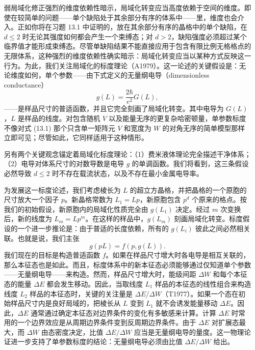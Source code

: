 弱局域化修正强烈的维度依赖性暗示，局域化转变应当高度依赖于空间的维度。即使在较简单的问题——单个缺陷处于其余部分有序的体系中——里，维度也会介入。正如你将在习题 13.1 中证明的，放在其余部分有序的晶格中的单个缺陷，在 $d\leq 2$ 时无论其强度如何都会产生一个束缚态；对 $d>2$，缺陷强度必须超过某个临界值才能形成束缚态。尽管单缺陷结果不能直接应用于包含有限比例无格格点的无限体系，这种强烈的维度依赖性确实暗示：局域化转变应当以某种方式反映这一行为。为此，我们关注局域化的标度理论（A1979）。这一论述的关键假设是：无论维度如何，单个参数——由下式定义的无量纲电导（dimensionless conductance）
\begin{equation*}
g(L)=\frac{2\hbar}{e^{2}}G(L),\tag{13.23}
\end{equation*}
——是样品尺寸的普适函数，并且它完全刻画了局域化转变。其中电导为 $G(L)$，$L$ 是样品的线度。对包含随机 $V$ 以及能量无序的更复杂哈密顿量，单参数标度不像对式 (13.1) 那个只含单一矩阵元 $V$ 和宽度为 $W$ 的对角无序的简单模型那样立即可见；尽管如此，它同样适用于这种情形。

另有两个关键观念锚定着局域化标度理论：（1）费米液体理论完全描述干净体系；（2）电导对体系尺寸的对数导数是电导 $g$ 的单调函数。我们将看到，这三条假设必然导致 $d\leq 2$ 时不存在载流状态，以及不存在最小金属电导率。

为发展这一标度论述，我们考虑棱长为 $L$ 的超立方晶格，并把晶格的一个原胞的尺寸放大一个因子 $p$。新晶格常数为 $L_{1}=Lp$，新原胞包含 $p^{d}$ 个原来的格点。按我们的初始假设，新原胞内的局域化性质完全由 $g(L_{1})$ 决定。经过 $m$ 次变换后，新的线度为 $L_{m}=Lp^{m}$。在这样的样品中，$g(L_{m})$ 刻画局域化转变。标度假设的一个进一步推论是：由于普适的长度依赖，所有的 $g(L_{i})$ 彼此之间必然相关联。也就是说，我们主张
\begin{equation*}
g(pL)=f(p,g(L)).\tag{13.24}
\end{equation*}
我们现在的目标是构造普适函数 $f$。如果在样品尺寸增大时各电导是相互关联的，那么本征态也是如此。而且，标度体系中的新本征态必须能够通过仅知道单个参数——无量纲电导——来构造。然而，样品尺寸增大时，能级间距 $\Delta W$ 和每个本征态的能量 $\Delta E$ 都会发生移动。因此，当取线度 $L_{1}$ 样品的本征态的线性组合来构造线度 $L_{2}$ 样品的本征态时，关键的关注量是 $\Delta E/\Delta W$（T1977）。如果一个态在初始样品尺寸内是良好局域的，把棱长从 $L$ 变到 $L_{1}$ 就不会诱发能量移动 $\Delta E$。因此，$\Delta E$ 通常通过确定本征态对边界条件的变化有多敏感来计算。计算 $\Delta E$ 时常用的一个边界效应是从周期边界条件变到反周期边界条件。由于 $\Delta E$ 对扩展态最大，而 $\Delta W$ 由态密度决定，比值 $\Delta E/\Delta W$ 应当是无量纲电导的量度。这一物理论证进一步支持了单参数标度的结论：无量纲电导必须由比值 $\Delta E/\Delta W$ 给出。

